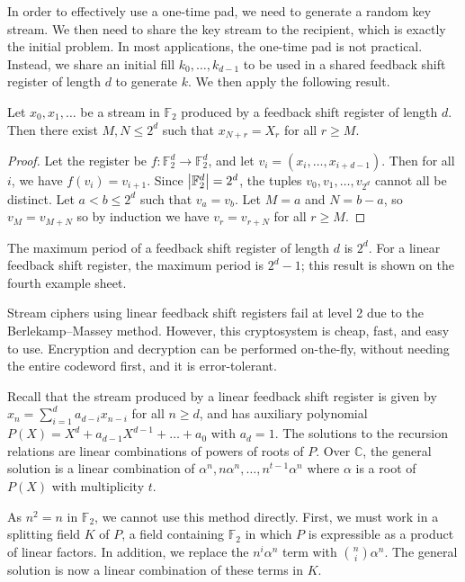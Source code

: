 In order to effectively use a one-time pad, we need to generate a random key stream.
We then need to share the key stream to the recipient, which is exactly the initial problem.
In most applications, the one-time pad is not practical.
Instead, we share an initial fill \( k_0, \dots, k_{d-1} \) to be used in a shared feedback shift register of length \( d \) to generate \( k \).
We then apply the following result.
\begin{lemma}
    Let \( x_0, x_1, \dots \) be a stream in \( \mathbb F_2 \) produced by a feedback shift register of length \( d \).
    Then there exist \( M, N \leq 2^d \) such that \( x_{N+r} = X_{r} \) for all \( r \geq M \).
\end{lemma}
\begin{proof}
    Let the register be \( f \colon \mathbb F_2^d \to \mathbb F_2^d \), and let \( v_i = (x_i, \dots, x_{i+d-1}) \).
    Then for all \( i \), we have \( f(v_i) = v_{i+1} \).
    Since \( \abs{\mathbb F_2^d} = 2^d \), the tuples \( v_0, v_1, \dots, v_{2^d} \) cannot all be distinct.
    Let \( a < b \leq 2^d \) such that \( v_a = v_b \).
    Let \( M = a \) and \( N = b - a \), so \( v_M = v_{M+N} \) so by induction we have \( v_r = v_{r+N} \) for all \( r \geq M \).
\end{proof}
\begin{remark}
    The maximum period of a feedback shift register of length \( d \) is \( 2^d \).
    For a linear feedback shift register, the maximum period is \( 2^d - 1 \); this result is shown on the fourth example sheet.

    Stream ciphers using linear feedback shift registers fail at level 2 due to the Berlekamp--Massey method.
    However, this cryptosystem is cheap, fast, and easy to use.
    Encryption and decryption can be performed on-the-fly, without needing the entire codeword first, and it is error-tolerant.
\end{remark}
Recall that the stream produced by a linear feedback shift register is given by \( x_n = \sum_{i=1}^d a_{d-i} x_{n-i} \) for all \( n \geq d \), and has auxiliary polynomial \( P(X) = X^d + a_{d-1}X^{d-1} + \dots + a_0 \) with \( a_d = 1 \).
The solutions to the recursion relations are linear combinations of powers of roots of \( P \).
Over \( \mathbb C \), the general solution is a linear combination of \( \alpha^n, n\alpha^n, \dots, n^{t-1} \alpha^n \) where \( \alpha \) is a root of \( P(X) \) with multiplicity \( t \).

As \( n^2 = n \) in \( \mathbb F_2 \), we cannot use this method directly.
First, we must work in a splitting field \( K \) of \( P \), a field containing \( \mathbb F_2 \) in which \( P \) is expressible as a product of linear factors.
In addition, we replace the \( n^i \alpha^n \) term with \( \binom{n}{i} \alpha^n \).
The general solution is now a linear combination of these terms in \( K \).

